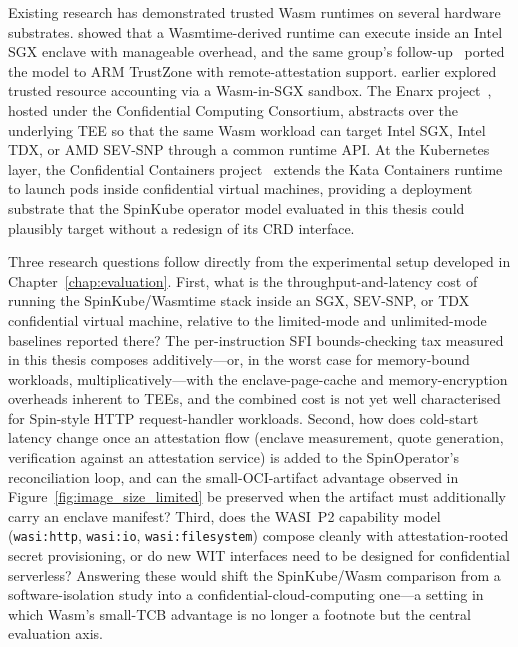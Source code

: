 \begin{sloppypar}
Existing research has demonstrated trusted Wasm runtimes on several hardware substrates. \textcite{menetrey2021twine} showed that a Wasmtime-derived runtime can execute inside an Intel \acs{SGX} enclave with manageable overhead, and the same group's follow-up~\cite{menetrey2022watz} ported the model to ARM TrustZone with remote-attestation support. \textcite{goltzsche2019acctee} earlier explored trusted resource accounting via a Wasm-in-\acs{SGX} sandbox. The Enarx project~\cite{enarx2024}, hosted under the Confidential Computing Consortium, abstracts over the underlying \acs{TEE} so that the same Wasm workload can target Intel \acs{SGX}, Intel \acs{TDX}, or AMD \acs{SEV}-SNP through a common runtime \acs{API}. At the Kubernetes layer, the Confidential Containers project~\cite{cncf2024coco} extends the Kata Containers runtime to launch pods inside confidential virtual machines, providing a deployment substrate that the SpinKube operator model evaluated in this thesis could plausibly target without a redesign of its \acs{CRD} interface.
\end{sloppypar}

\begin{sloppypar}
Three research questions follow directly from the experimental setup developed in Chapter~\ref{chap:evaluation}. First, what is the throughput-and-latency cost of running the SpinKube/Wasmtime stack inside an \acs{SGX}, \acs{SEV}-SNP, or \acs{TDX} confidential virtual machine, relative to the limited-mode and unlimited-mode baselines reported there? The per-instruction \acs{SFI} bounds-checking tax measured in this thesis composes additively---or, in the worst case for memory-bound workloads, multiplicatively---with the enclave-page-cache and memory-encryption overheads inherent to \acs{TEE}s, and the combined cost is not yet well characterised for Spin-style \acs{HTTP} request-handler workloads. Second, how does cold-start latency change once an attestation flow (enclave measurement, quote generation, verification against an attestation service) is added to the SpinOperator's reconciliation loop, and can the small-\acs{OCI}-artifact advantage observed in Figure~\ref{fig:image_size_limited} be preserved when the artifact must additionally carry an enclave manifest? Third, does the \acs{WASI}~P2 capability model (\texttt{wasi:http}, \texttt{wasi:io}, \texttt{wasi:filesystem}) compose cleanly with attestation-rooted secret provisioning, or do new \acs{WIT} interfaces need to be designed for confidential serverless? Answering these would shift the SpinKube/Wasm comparison from a software-isolation study into a confidential-cloud-computing one---a setting in which Wasm's small-\acs{TCB} advantage is no longer a footnote but the central evaluation axis.
\end{sloppypar}

